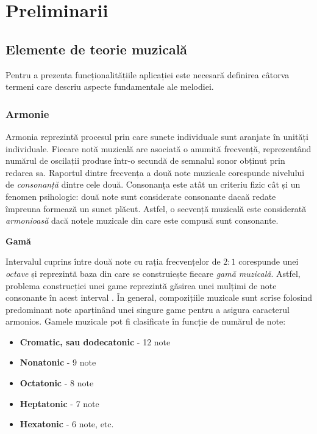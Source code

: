 \section{Preliminarii}

\subsection{Elemente de teorie muzicală}
\noindent
Pentru a prezenta funcționalitățiile aplicației este necesară definirea câtorva termeni care descriu aspecte fundamentale ale melodiei. 

\subsubsection{Armonie}
\noindent Armonia reprezintă procesul prin care sunete individuale sunt aranjate în unități individuale. Fiecare notă muzicală are asociată o anumită frecvență, reprezentând numărul de oscilații produse într-o secundă de semnalul sonor obținut prin redarea sa. Raportul dintre frecvența a două note muzicale corespunde nivelului de \textit{consonanță} dintre cele două. Consonanța este atât un criteriu fizic cât și un fenomen psihologic: două note sunt considerate consonante dacaă redate împreuna formează un sunet plăcut. Astfel, o secvență muzicală este considerată \textit{armonioasă} dacă notele muzicale din care este compusă sunt consonante. \par
\noindent \textbf{Gamă} \par
\noindent Intervalul cuprins între două note cu rația frecvențelor de $2:1$ corespunde unei \textit{octave} și reprezintă baza din care se construiește fiecare \textit{gamă muzicală}. Astfel, problema construcției unei game reprezintă găsirea unei mulțimi de note consonante în acest interval \cite{history}.  În general, compozițiile muzicale sunt scrise folosind predominant note aparținând unei singure game pentru a asigura caracterul armonios. Gamele muzicale pot fi clasificate în funcție de numărul de note: 

\begin{itemize}[topsep=5pt,itemsep=2pt,parsep=0pt,partopsep=0pt]
    \item \textbf{Cromatic, sau dodecatonic} - 12 note
    \item \textbf{Nonatonic} - 9 note
    \item \textbf{Octatonic} - 8 note
    \item \textbf{Heptatonic} - 7 note
    \item \textbf{Hexatonic} - 6 note, etc.
\end{itemize} 

